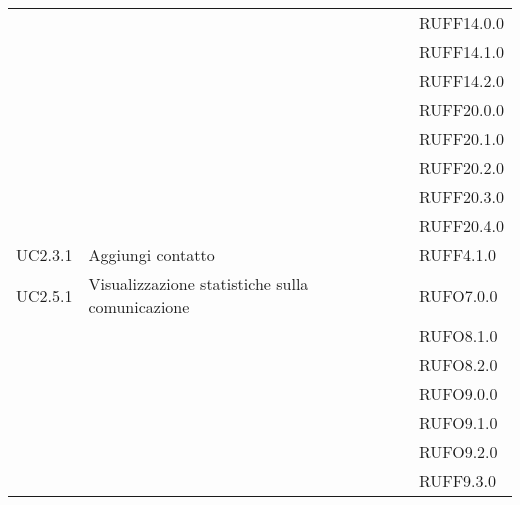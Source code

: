 \begin{longtable}{lp{}l}
 &  & RUFF14.0.0 \\
 &  & RUFF14.1.0 \\
 &  & RUFF14.2.0 \\
 &  & RUFF20.0.0 \\
 &  & RUFF20.1.0 \\
 &  & RUFF20.2.0 \\
 &  & RUFF20.3.0 \\
 &  & RUFF20.4.0 \\
UC2.3.1 & Aggiungi contatto & RUFF4.1.0 \\
UC2.5.1 & Visualizzazione statistiche sulla comunicazione & RUFO7.0.0 \\
 &  & RUFO8.1.0 \\
 &  & RUFO8.2.0 \\
 &  & RUFO9.0.0 \\
 &  & RUFO9.1.0 \\
 &  & RUFO9.2.0 \\
 &  & RUFF9.3.0 \\
\bottomrule
\end{longtable}
